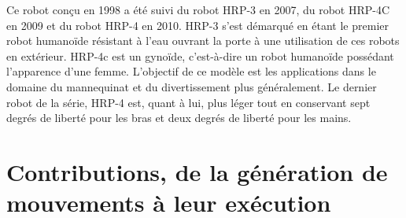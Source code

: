 Ce robot conçu en 1998 a été suivi du robot HRP-3 en 2007, du robot
HRP-4C en 2009 et du robot HRP-4 en 2010. HRP-3 s'est démarqué en
étant le premier robot humanoïde résistant à l'eau ouvrant la porte à
une utilisation de ces robots en extérieur. HRP-4c est un gynoïde,
c'est-à-dire un robot humanoïde possédant l'apparence d'une
femme. L'objectif de ce modèle est les applications dans le domaine du
mannequinat et du divertissement plus généralement. Le dernier robot
de la série, HRP-4 est, quant à lui, plus léger tout en conservant
sept degrés de liberté pour les bras et deux degrés de liberté pour
les mains.


\section{Contributions, de la génération de mouvements à leur exécution}


